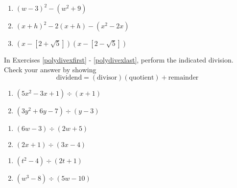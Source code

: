 \begin{multicols}{3}
\begin{enumerate}
\setcounter{enumi}{\value{HW}}


\item $(w-3)^2 - (w^2 + 9)$
\item $(x+h)^2 - 2(x+h) - (x^2 - 2x)$
\item $(x-[2+\sqrt{5}])(x-[2-\sqrt{5}])$ \label{polyarithexlast}

\setcounter{HW}{\value{enumi}}
\end{enumerate}
\end{multicols}

In Exercises \ref{polydivexfirst} - \ref{polydivexlast}, perform the indicated division.  Check your answer by showing \[\text{dividend} = (\text{divisor})( \text{quotient}) + \text{remainder}\]

\begin{multicols}{2}
\begin{enumerate}
\setcounter{enumi}{\value{HW}}

\item $(5x^2 - 3x + 1) \div (x + 1)$ \label{polydivexfirst}
\item $(3y^2 + 6y - 7) \div (y-3)$

\setcounter{HW}{\value{enumi}}
\end{enumerate}
\end{multicols}


\begin{multicols}{2}
\begin{enumerate}
\setcounter{enumi}{\value{HW}}

\item $(6w - 3) \div (2w+5)$
\item $(2x+1) \div (3x-4)$


\setcounter{HW}{\value{enumi}}
\end{enumerate}
\end{multicols}


\begin{multicols}{2}
\begin{enumerate}
\setcounter{enumi}{\value{HW}}

\item $(t^2 - 4) \div (2t + 1)$

\item $(w^3 - 8) \div (5w-10)$

\setcounter{HW}{\value{enumi}}
\end{enumerate}
\end{multicols}

